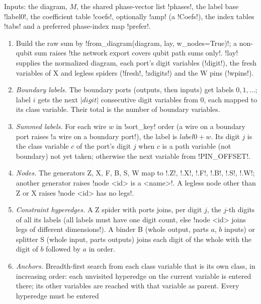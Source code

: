 {{{\begin{algorithm}\label{alg:lean-export-net-side}
Inputs: the diagram, $M$, the shared phase-vector list \lexcode!phases!, the label base
\lexcode!label0!, the coefficient table \lexcode!coefs!, optionally \lexcode!amp! (a \lexpy!Coefs!), the
index tables \lexcode!tabs! and a preferred phase-index map \lexcode!prefer!.
\begin{enumerate}
\item Build the raw sum by \lexpy!from_diagram(diagram, lay, w_nodes=True)!; a non-qubit sum
raises \lexcode!the network export covers qubit path sums only!. \lexcode!lay! supplies the
normalized diagram, each port's digit variables (\lexcode!digit!), the fresh variables of X and
legless spiders (\lexcode!fresh!, \lexcode!zdigits!) and the W pins (\lexcode!wpins!).
\item \emph{Boundary labels.} The boundary ports (outputs, then inputs) get labels $0,1,\ldots$;
label $i$ gets the next $|\mathit{digit}|$ consecutive digit variables from 0, each mapped to
its class variable. Their total is the number of boundary variables.
\item \emph{Summed labels.} For each wire $w$ in \lexpy!sort_key! order (a wire on a boundary port
raises \lexcode!a wire on a boundary port!), the label is $\mathit{label0}+w$. Its digit $j$ is the
class variable $c$ of the port's digit $j$ when $c$ is a path variable (not boundary) not yet
taken; otherwise the next variable from \lexpy!PIN_OFFSET!.
\item \emph{Nodes.} The generators Z, X, F, B, S, W map to \lexlean!.Z!, \lexlean!.X!, \lexlean!.F!,
\lexlean!.B!, \lexlean!.S!, \lexlean!.W!; another generator raises \lexcode!node <id> is a <name>!. A legless
node other than Z or X raises \lexcode!node <id> has no legs!.
\item \emph{Constraint hyperedges.} A Z spider with ports joins, per digit $j$, the $j$-th
digits of all its labels (all labels must have one digit count, else \lexcode!node <id> joins legs of different dimensions!). A binder B (whole output, parts $a$, $b$ inputs) or splitter S (whole
input, parts outputs) joins each digit of the whole with the digit of $b$ followed by $a$ in
order.
\item \emph{Anchors.} Breadth-first search from each class variable that is its own class, in
increasing order: each unvisited hyperedge on the current variable is entered there; its other
variables are reached with that variable as parent. Every hyperedge must be entered

\end{enumerate}
\end{algorithm}}}}
